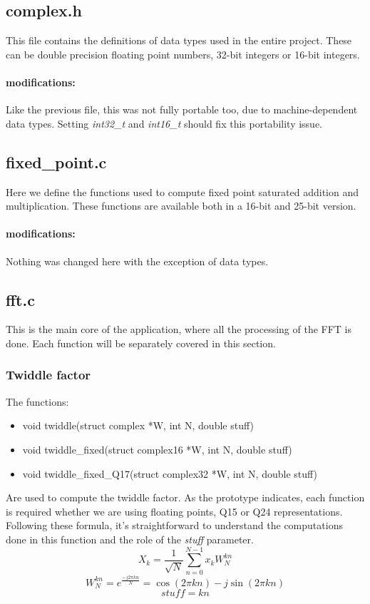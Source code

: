\documentclass[a4paper]{article}
\begin{document}
\subsection{complex.h}
This file contains the definitions of data types used in the entire project. These can be double precision floating point numbers, 32-bit integers or 16-bit integers.
\paragraph{modifications:}
Like the previous file, this was not fully portable too, due to machine-dependent data types. Setting \textit{int32\_t} and \textit{int16\_t} should fix this portability issue. 

\subsection{fixed\_point.c}
Here we define the functions used to compute fixed point saturated addition and multiplication. These functions are available both in a 16-bit and 25-bit version.
\paragraph{modifications:}
Nothing was changed here with the exception of data types.

\subsection{fft.c}
This is the main core of the application, where all the processing of the FFT is done. Each function will be separately covered in this section.


\subsubsection{Twiddle factor}
The functions:
\begin{itemize}
\item void twiddle(struct complex *W, int N, double stuff)
\item void twiddle\_fixed(struct complex16 *W, int N, double stuff)         
\item void twiddle\_fixed\_Q17(struct complex32 *W, int N, double stuff)
\end{itemize}
Are used to compute the twiddle factor. As the prototype indicates, each function is required whether we are using floating points, Q15 or Q24 representations.\\
Following these formula, it's straightforward to understand the computations done in this function and the role of the \textit{stuff} parameter.
$$X_k = \frac{1}{\sqrt{N}}\sum_{n=0}^{N-1} x_k W_N^{kn} $$
$$W_N^{kn} = e^{\frac{-j2\pi kn}{N}} = \cos{(2\pi kn)} - j\sin{(2\pi kn)}$$
$$\mathit{stuff} = kn$$
\end{document}

